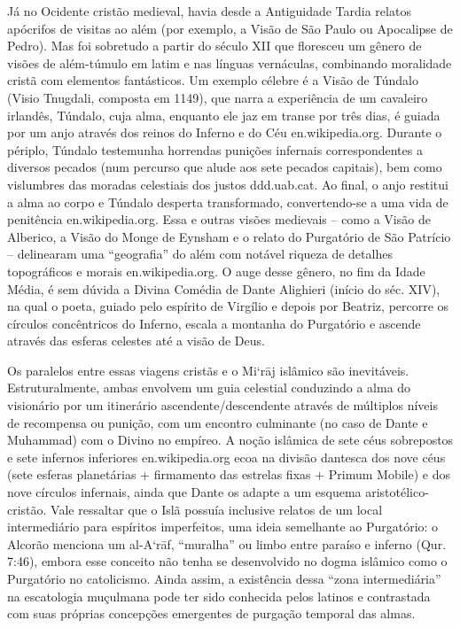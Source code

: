Já no Ocidente cristão medieval, havia desde a Antiguidade Tardia relatos apócrifos de visitas ao além (por exemplo, a Visão de São Paulo ou Apocalipse de Pedro). Mas foi sobretudo a partir do século XII que floresceu um gênero de visões de além-túmulo em latim e nas línguas vernáculas, combinando moralidade cristã com elementos fantásticos. Um exemplo célebre é a Visão de Túndalo (Visio Tnugdali, composta em 1149), que narra a experiência de um cavaleiro irlandês, Túndalo, cuja alma, enquanto ele jaz em transe por três dias, é guiada por um anjo através dos reinos do Inferno e do Céu en.wikipedia.org. Durante o périplo, Túndalo testemunha horrendas punições infernais correspondentes a diversos pecados (num percurso que alude aos sete pecados capitais), bem como vislumbres das moradas celestiais dos justos ddd.uab.cat. Ao final, o anjo restitui a alma ao corpo e Túndalo desperta transformado, convertendo-se a uma vida de penitência en.wikipedia.org. Essa e outras visões medievais -- como a Visão de Alberico, a Visão do Monge de Eynsham e o relato do Purgatório de São Patrício -- delinearam uma “geografia” do além com notável riqueza de detalhes topográficos e morais en.wikipedia.org. O auge desse gênero, no fim da Idade Média, é sem dúvida a Divina Comédia de Dante Alighieri (início do séc. XIV), na qual o poeta, guiado pelo espírito de Virgílio e depois por Beatriz, percorre os círculos concêntricos do Inferno, escala a montanha do Purgatório e ascende através das esferas celestes até a visão de Deus.

Os paralelos entre essas viagens cristãs e o Mi‘rāj islâmico são inevitáveis. Estruturalmente, ambas envolvem um guia celestial conduzindo a alma do visionário por um itinerário ascendente/descendente através de múltiplos níveis de recompensa ou punição, com um encontro culminante (no caso de Dante e Muhammad) com o Divino no empíreo. A noção islâmica de sete céus sobrepostos e sete infernos inferiores en.wikipedia.org ecoa na divisão dantesca dos nove céus (sete esferas planetárias + firmamento das estrelas fixas + Primum Mobile) e dos nove círculos infernais, ainda que Dante os adapte a um esquema aristotélico-cristão. Vale ressaltar que o Islã possuía inclusive relatos de um local intermediário para espíritos imperfeitos, uma ideia semelhante ao Purgatório: o Alcorão menciona um al-A‘rāf, “muralha” ou limbo entre paraíso e inferno (Qur. 7:46), embora esse conceito não tenha se desenvolvido no dogma islâmico como o Purgatório no catolicismo. Ainda assim, a existência dessa “zona intermediária” na escatologia muçulmana pode ter sido conhecida pelos latinos e contrastada com suas próprias concepções emergentes de purgação temporal das almas.

